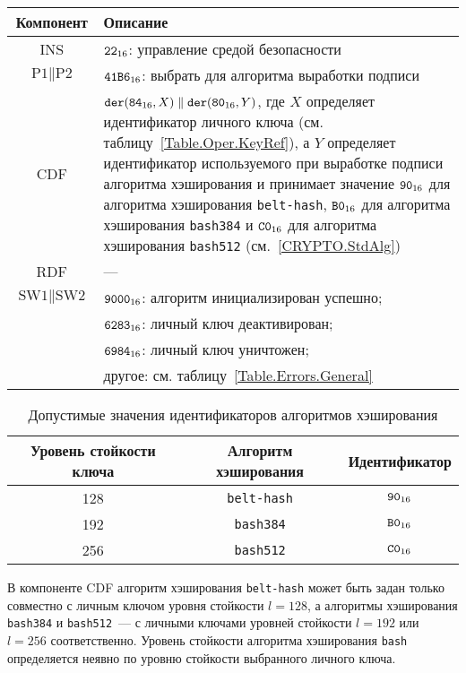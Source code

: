 \begin{table}[hbt]
\caption{}\label{Table.Oper.SetDSTCmd}
\begin{tabular}{|c|p{14cm}|}
\hline
Компонент & Описание \\
\hline
\hline
INS & $\texttt{22}_{16}$: управление средой безопасности\\ 
\hline
$\text{P1} \parallel\text{P2}$ & $\texttt{41B6}_{16}$: 
выбрать для алгоритма выработки подписи \\
\hline
CDF & 
$\texttt{der}(\texttt{84}_{16}, X) \parallel \texttt{der}(\texttt{80}_{16}, Y)$, 
где $X$ определяет идентификатор личного ключа (см. таблицу~\ref{Table.Oper.KeyRef}), 
а $Y$ определяет идентификатор используемого при выработке
подписи алгоритма хэширования 
и принимает значение $\texttt{90}_{16}$ для алгоритма хэширования \texttt{belt-hash},  
$\texttt{B0}_{16}$ для алгоритма хэширования \texttt{bash384} и 
$\texttt{C0}_{16}$ для алгоритма хэширования \texttt{bash512} (см.~\ref{CRYPTO.StdAlg})\\
\hline 
RDF &  --- \\
\hline
$\text{SW1} \parallel \text{SW2}$ & 
$\texttt{9000}_{16}$: алгоритм инициализирован успешно; \\
  & $\texttt{6283}_{16}$: личный ключ деактивирован; \\
  & $\texttt{6984}_{16}$: личный ключ уничтожен; \\
  & другое: см. таблицу~\ref{Table.Errors.General} \\
\hline
\end{tabular}
\end{table}


\begin{table}[hbt]
\caption{Допустимые значения идентификаторов алгоритмов хэширования}
\label{Table.Oper.AlgRef}
\begin{tabular}{|c|c|c|}
\hline
Уровень стойкости ключа & Алгоритм хэширования  & Идентификатор  \\
\hline
\hline
128 & \texttt{belt-hash} & $\texttt{90}_{16}$ \\
192 & \texttt{bash384} & $\texttt{B0}_{16}$ \\
256 & \texttt{bash512} & $\texttt{C0}_{16}$ \\
\hline
\end{tabular}
\end{table}

\fi


В компоненте CDF алгоритм хэширования \texttt{belt-hash}
может быть задан только совместно с личным ключом 
уровня стойкости $l=128$,
а алгоритмы хэширования \texttt{bash384} и \texttt{bash512}~--- 
с личными ключами уровней стойкости $l=192$ или $l=256$
соответственно.
Уровень стойкости алгоритма хэширования \texttt{bash} определяется 
неявно по уровню стойкости выбранного личного ключа.

